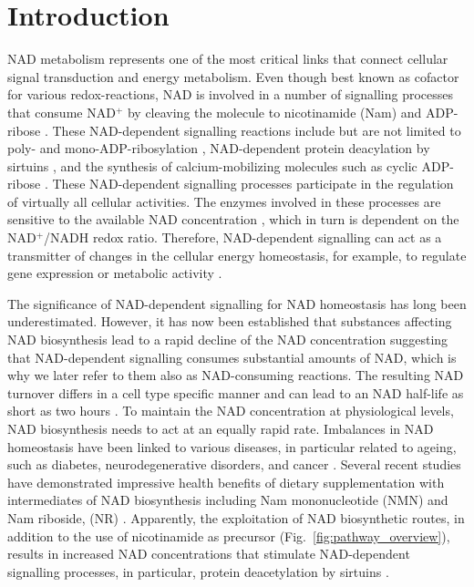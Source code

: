 
\section{Introduction}

NAD metabolism represents one of the most critical links that connect cellular signal transduction and energy metabolism. Even though best known as cofactor for various redox-reactions, NAD is involved in a number of signalling processes that consume NAD$^{+}$ by cleaving the molecule to nicotinamide (Nam) and ADP-ribose \cite{Verdin2015}. These NAD-dependent signalling reactions include but are not limited to poly- and mono-ADP-ribosylation \cite{Butepage2015,DeVos2012}, NAD-dependent protein deacylation by sirtuins \cite{Osborne2016}, and the synthesis of calcium-mobilizing molecules such as cyclic ADP-ribose \cite{Lee2012}. These NAD-dependent signalling processes participate in the regulation of virtually all cellular activities. The enzymes involved in these processes are sensitive to the available NAD concentration \cite{Ruggieri2015}, which in turn is dependent on the NAD$^{+}$/NADH redox ratio. Therefore, NAD-dependent signalling can act as a transmitter of changes in the cellular energy homeostasis, for example, to regulate gene expression or metabolic activity \cite{Koch-Nolte2009}.

The significance of NAD-dependent signalling for NAD homeostasis has long been underestimated. However, it has now been established that substances affecting NAD biosynthesis lead to a rapid decline of the NAD concentration \cite{Buonvicino2018} suggesting that NAD-dependent signalling consumes substantial amounts of NAD, which is why we later refer to them also as NAD-consuming reactions. The resulting NAD turnover differs in a cell type specific manner and can lead to an NAD half-life as short as two hours \cite{Liu2018}. To maintain the NAD concentration at physiological levels, NAD biosynthesis needs to act at an equally rapid rate. Imbalances in NAD homeostasis have been linked to various diseases, in particular related to ageing, such as diabetes, neurodegenerative disorders, and cancer \cite{Chiarugi2012,Verdin2015}. Several recent studies have demonstrated impressive health benefits of dietary supplementation with intermediates of NAD biosynthesis including Nam mononucleotide (NMN) and Nam riboside, (NR) \cite{Yoshino2018}. Apparently, the exploitation of NAD biosynthetic routes, in addition to the use of nicotinamide as precursor (Fig.~\ref{fig:pathway_overview}), results in increased NAD concentrations that stimulate NAD-dependent signalling processes, in particular, protein deacetylation by sirtuins \cite{North2004}.

